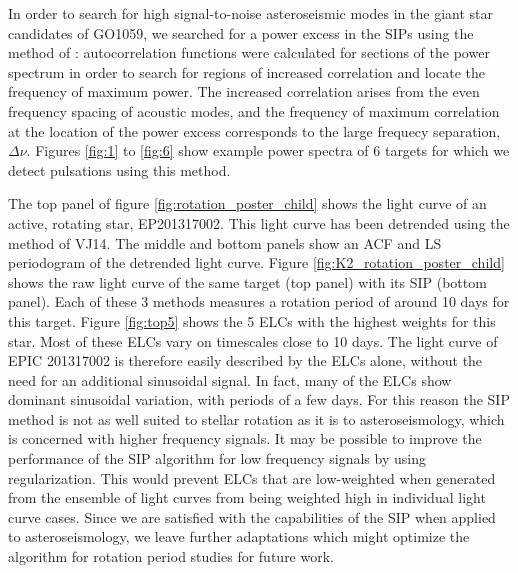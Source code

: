 \documentclass[useAMS, usenatbib, preprint, 12pt]{aastex}
\begin{document}
In order to search for high signal-to-noise asteroseismic modes in the giant
star candidates of GO1059, we searched for a power excess in the SIPs using the
method of \citet{Huber2009}: autocorrelation functions were calculated for
sections of the power spectrum in order to search for regions of increased
correlation and locate the frequency of maximum power.
The increased correlation arises from the even frequency spacing of acoustic
modes, and the frequency of maximum correlation at the location of the power
excess corresponds to the large frequecy separation, $\Delta\nu$.
Figures \ref{fig:1} to \ref{fig:6} show example power spectra of 6 targets for
which we detect pulsations using this method.

The top panel of figure \ref{fig:rotation_poster_child} shows the light curve
of an active, rotating star, EP201317002.
This light curve has been detrended using the method of
VJ14.
The middle and bottom panels show an ACF and LS periodogram of the
detrended light curve.
Figure \ref{fig:K2_rotation_poster_child} shows the raw light curve of the
same target (top panel) with its SIP (bottom panel).
Each of these 3 methods measures a rotation period of around 10 days for this
target.
Figure \ref{fig:top5} shows the 5 ELCs with the highest weights for this star.
Most of these ELCs vary on timescales close to 10 days.
The light curve of EPIC 201317002 is therefore easily described by the ELCs
alone, without the need for an additional sinusoidal signal.
In fact, many of the ELCs show dominant sinusoidal variation, with periods
of a few days.
For this reason the SIP method is not as well suited to stellar rotation as it
is to asteroseismology, which is concerned with higher frequency signals.
It may be possible to improve the performance of the SIP algorithm for low
frequency signals by using regularization.
This would prevent ELCs that are low-weighted when generated from the
ensemble of light curves from being weighted high in individual light curve
cases.
Since we are satisfied with the capabilities of the SIP when applied to
asteroseismology, we leave further adaptations which might optimize the
algorithm for rotation period studies for future work.
\end{document}
